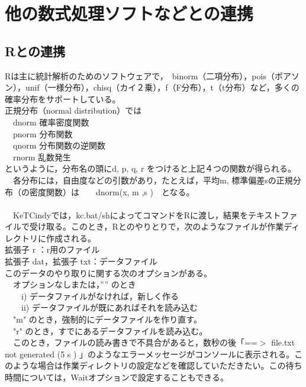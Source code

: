 \documentclass[papersize,a4paper,12pt,uplatex]{jsarticle}
\begin{document}
\section{他の数式処理ソフトなどとの連携}
\subsection{Rとの連携}
Rは主に統計解析のためのソフトウェアで，　binorm（二項分布），pois（ポアソン），unif（一様分布），chisq（カイ２乗），f（F分布），t（t分布）など，多くの確率分布をサポートしている。\\
正規分布（normal distribution）では\\
　dnorm 確率密度関数\\
　pnorm 分布関数\\
　qnorm 分布関数の逆関数\\
　rnorm  乱数発生\\
というように，分布名の頭にd, p, q, r をつけると上記４つの関数が得られる。\\
　各分布には，自由度などの引数があり，たとえば，平均m, 標準偏差sの正規分布（の密度関数）は　　dnorm(x, m ,s )　となる。\\
　\\
　KeTCindyでは，kc.bat/shによってコマンドをRに渡し，結果をテキストファイルで受け取る。このとき，Rとのやりとりで，次のようなファイルが作業ディレクトリに作成される。\\
拡張子 r ：r用のファイル\\
拡張子 dat，拡張子 txt：データファイル\\
このデータのやり取りに関する次のオプションがある。\\
　オプションなしまたは，”” のとき\\
　　i) データファイルがなければ，新しく作る\\
　　ii) データファイルが既にあればそれを読み込む\\
　"m"  のとき，強制的にデータファイルを作り直す。\\
　"r" のとき，すでにあるデータファイルを読み込む。\\ 
　このとき，ファイルの読み書きで不具合があると，数秒の後「==$>$ file.txt not generated (5 s ) 」のようなエラーメッセージがコンソールに表示される。このような場合は作業ディレクトリの設定などを確認していただきたい。この待ち時間については，Waitオプションで設定することもできる。\\
　\\
\end{document}
